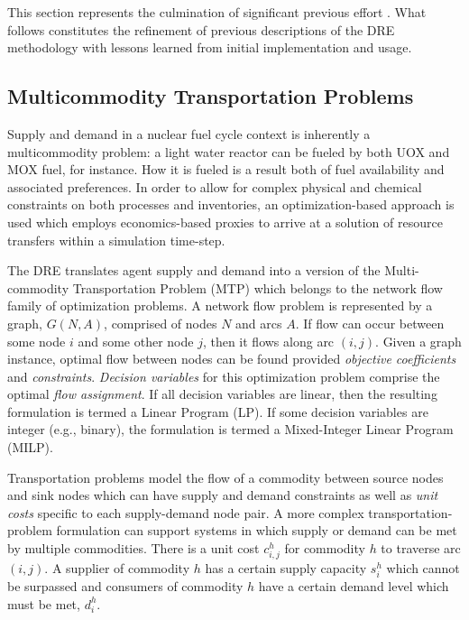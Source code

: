 This section represents the culmination of significant previous effort
\cite{gidden_agent-based_2013, gidden_agent-based_2014,
  gidden_agent-based_slc_2013}. What follows constitutes the refinement of
previous descriptions of the DRE methodology with lessons learned from initial
implementation and usage.

\subsection{Multicommodity Transportation Problems}\label{meth:mtp}

Supply and demand in a nuclear fuel cycle context is inherently a multicommodity
problem: a light water reactor can be fueled by both UOX and MOX fuel, for
instance. How it is fueled is a result both of fuel availability and associated
preferences. In order to allow for complex physical and chemical constraints on
both processes and inventories, an optimization-based approach is used which
employs economics-based proxies to arrive at a solution of resource transfers
within a simulation time-step.

The DRE translates agent supply and demand into a version of the Multi-commodity
Transportation Problem (MTP) \cite{even1975complexity} which belongs to the
network flow family of optimization problems. A network flow problem is
represented by a graph, $G(N, A)$, comprised of nodes $N$ and arcs $A$. If flow
can occur between some node $i$ and some other node $j$, then it flows along arc
$(i, j)$. Given a graph instance, optimal flow between nodes can be found
provided \textit{objective coefficients} and
\textit{constraints}. \textit{Decision variables} for this optimization problem
comprise the optimal \textit{flow assignment}. If all decision variables are
linear, then the resulting formulation is termed a Linear Program (LP). If some
decision variables are integer (e.g., binary), the formulation is termed a
Mixed-Integer Linear Program (MILP).

Transportation problems model the flow of a commodity between source nodes and
sink nodes which can have supply and demand constraints as well as \textit{unit
  costs} specific to each supply-demand node pair. A more complex
transportation-problem formulation can support systems in which supply or demand
can be met by multiple commodities.  There is a unit cost $c_{i,j}^{h}$ for
commodity $h$ to traverse arc $(i,j)$. A supplier of commodity $h$ has a certain
supply capacity $s_i^h$ which cannot be surpassed and consumers of commodity $h$
have a certain demand level which must be met, $d_i^h$. 


